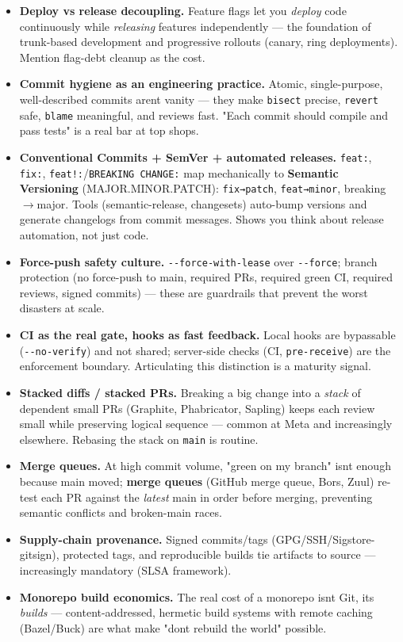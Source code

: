 \documentclass[11pt]{article}
\providecommand{\tightlist}{\setlength{\itemsep}{1pt}\setlength{\parskip}{0pt}}
\begin{document}
\begin{itemize}
\tightlist
\item
  \textbf{Deploy vs release decoupling.} Feature flags let you \emph{deploy} code continuously while \emph{releasing} features independently --- the foundation of trunk-based development and progressive rollouts (canary, ring deployments). Mention flag-debt cleanup as the cost.
\item
  \textbf{Commit hygiene as an engineering practice.} Atomic, single-purpose, well-described commits aren\textquotesingle t vanity --- they make \texttt{bisect} precise, \texttt{revert} safe, \texttt{blame} meaningful, and reviews fast. "Each commit should compile and pass tests" is a real bar at top shops.
\item
  \textbf{Conventional Commits + SemVer + automated releases.} \texttt{feat:}, \texttt{fix:}, \texttt{feat!:}/\texttt{BREAKING\ CHANGE:} map mechanically to \textbf{Semantic Versioning} (MAJOR.MINOR.PATCH): \texttt{fix→patch}, \texttt{feat→minor}, breaking\(\rightarrow\)major. Tools (semantic-release, changesets) auto-bump versions and generate changelogs from commit messages. Shows you think about release automation, not just code.
\item
  \textbf{Force-push safety culture.} \texttt{-\/-force-with-lease} over \texttt{-\/-force}; branch protection (no force-push to main, required PRs, required green CI, required reviews, signed commits) --- these are guardrails that prevent the worst disasters at scale.
\item
  \textbf{CI as the real gate, hooks as fast feedback.} Local hooks are bypassable (\texttt{-\/-no-verify}) and not shared; server-side checks (CI, \texttt{pre-receive}) are the enforcement boundary. Articulating this distinction is a maturity signal.
\item
  \textbf{Stacked diffs / stacked PRs.} Breaking a big change into a \emph{stack} of dependent small PRs (Graphite, Phabricator, Sapling) keeps each review small while preserving logical sequence --- common at Meta and increasingly elsewhere. Rebasing the stack on \texttt{main} is routine.
\item
  \textbf{Merge queues.} At high commit volume, "green on my branch" isn\textquotesingle t enough because main moved; \textbf{merge queues} (GitHub merge queue, Bors, Zuul) re-test each PR against the \emph{latest} main in order before merging, preventing semantic conflicts and broken-main races.
\item
  \textbf{Supply-chain provenance.} Signed commits/tags (GPG/SSH/Sigstore-gitsign), protected tags, and reproducible builds tie artifacts to source --- increasingly mandatory (SLSA framework).
\item
  \textbf{Monorepo build economics.} The real cost of a monorepo isn\textquotesingle t Git, it\textquotesingle s \emph{builds} --- content-addressed, hermetic build systems with remote caching (Bazel/Buck) are what make "don\textquotesingle t rebuild the world" possible.
\end{itemize}
\end{document}

